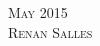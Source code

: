 \documentclass[landscape,a4paper]{article}
\begin{document}
\pagestyle{empty} %

\noindent



\begin{center}
\textsc{\LARGE May 2015}\\ %
\textsc{\large Renan Salles} %
\end{center}

\end{document}
